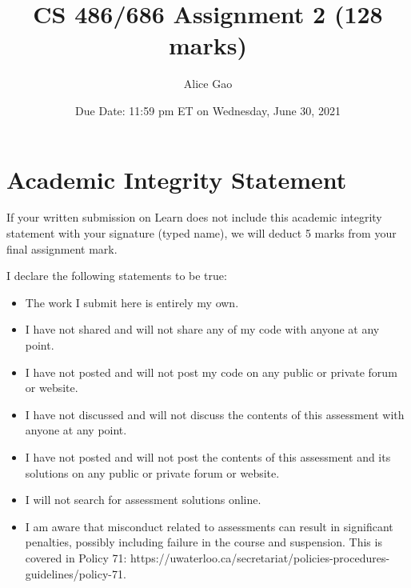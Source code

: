\documentclass[12pt]{article}
\title{CS 486/686 Assignment 2 (128 marks)}
\author{Alice Gao}
\date{Due Date: 11:59 pm ET on Wednesday, June 30, 2021}
\begin{document}
\maketitle



\newpage
\section*{Academic Integrity Statement}

{\color{red} If your written submission on Learn does not include this academic integrity statement with your signature (typed name), we will deduct 5 marks from your final assignment mark.}


I declare the following statements to be true:

\begin{itemize}
\item 
The work I submit here is entirely my own.

\item 	
I have not shared and will not share any of my code with anyone at any point. 

\item 
I have not posted and will not post my code on any public or private forum or website.

\item 	
I have not discussed and will not discuss the contents of this assessment with anyone at any point.

\item 
I have not posted and will not post the contents of this assessment and its solutions on any public or private forum or website. 

\item 
I will not search for assessment solutions online.

\item 
I am aware that misconduct related to assessments can result in significant penalties, possibly including failure in the course and suspension. This is covered in Policy 71: https://uwaterloo.ca/secretariat/policies-procedures-guidelines/policy-71.
\end{itemize}
\end{document}
